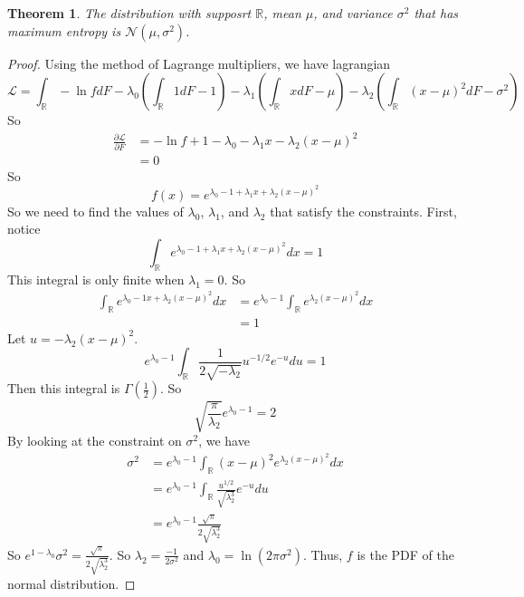 \documentclass{article}
\newtheorem{theorem}{Theorem}
\theoremstyle{definition}\newtheorem{definition}{DEF}
\theoremstyle{definition}\newtheorem{example}{Ex}
\theoremstyle{lemma}\newtheorem{lemma}{Lemma}
\theoremstyle{corrolary}\newtheorem{corrolary}{Cor}
\begin{document}
\begin{theorem}
The distribution with supposrt $\mathbb{R}$, mean $\mu$, and variance $\sigma^2$ that has maximum entropy is
$\mathcal{N} (\mu, \sigma^2)$.
\end{theorem}
\begin{proof}
Using the method of Lagrange multipliers, we have lagrangian
\begin{equation*}
\mathcal{L} = \int_\mathbb{R} -\ln f dF - \lambda_0 \left( \int_\mathbb{R} 1 dF - 1\right) - \lambda_1 \left( \int_\mathbb{R} x dF - \mu \right) - \lambda_2 \left( \int_\mathbb{R} (x-\mu)^2 dF - \sigma^2 \right)
\end{equation*}
So
\begin{align*}
\frac{\partial \mathcal{L}}{\partial F} 
&= -\ln f + 1 - \lambda_0 -\lambda_1 x -\lambda_2 (x-\mu)^2 \\
&= 0
\end{align*}
So
\begin{equation*}
f(x) = e^{\lambda_0 - 1 + \lambda_1 x + \lambda_2 (x-\mu)^2}
\end{equation*}
So we need to find the values of $\lambda_0$, $\lambda_1$, and $\lambda_2$ that satisfy the constraints.
First, notice
\begin{equation*}
\int_\mathbb{R} e^{\lambda_0 - 1 + \lambda_1 x + \lambda_2 (x-\mu)^2} dx = 1
\end{equation*}
This integral is only finite when $\lambda_1 = 0$.
So
\begin{align*}
\int_\mathbb{R} e^{\lambda_0 - 1 x + \lambda_2 (x-\mu)^2} dx 
&= e^{\lambda_0 - 1} \int_\mathbb{R} e^{\lambda_2 (x-\mu)^2} dx \\
&= 1
\end{align*}
Let $u=-\lambda_2 (x-\mu)^2$.
\begin{equation*}
 e^{\lambda_0 - 1} \int_\mathbb{R} \frac{1}{2\sqrt{-\lambda_2}} u^{-1/2} e^{-u} du = 1
\end{equation*}
Then this integral is $\Gamma\left( \frac{1}{2}\right)$.
So
\begin{equation*}
\sqrt{\frac{\pi}{\lambda_2}} e^{\lambda_0 - 1} = 2
\end{equation*}
By looking at the constraint on $\sigma^2$, we have
\begin{align*}
\sigma^2
&= e^{\lambda_0 - 1} \int_\mathbb{R} (x-\mu)^2 e^{\lambda_2 (x-\mu)^2} dx\\
&= e^{\lambda_0 - 1} \int_\mathbb{R} \frac{u^{1/2}}{\sqrt{\lambda_2^3}} e^{-u} du \\
&= e^{\lambda_0 - 1} \frac{\sqrt{\pi}}{2\sqrt{\lambda_2^3}}
\end{align*}
So $e^{1-\lambda_0}\sigma^2 = \frac{\sqrt{\pi}}{2\sqrt{\lambda_2^3}}$.
So $\lambda_2 = \frac{-1}{2\sigma^2}$ and $\lambda_0 = \ln (2\pi \sigma^2)$.
Thus, $f$ is the PDF of the normal distribution.
\end{proof}
\end{document}
